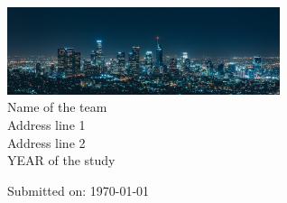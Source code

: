\documentclass[a4paper, 12pt, openany, english]{report}
\begin{document}
\begin{titlepage}
\begin{center}
                \includegraphics[width=0.6\textwidth]{img/landing/architecture.jpg}\\[0.4in]
                \Large{Name of the team}\\
                \normalsize
                Address line 1 \\
                Address line 2 \\
                \vspace{0.2cm}
                YEAR of the study
                \vspace{0.2cm}
                
                
                {\small Submitted on: \today}\\[2cm] %
                
        \end{center}
        \vfill %
\end{titlepage}





\tableofcontents

\listoffigures

\printglossary
\newpage

\printbibliography
\end{document}
